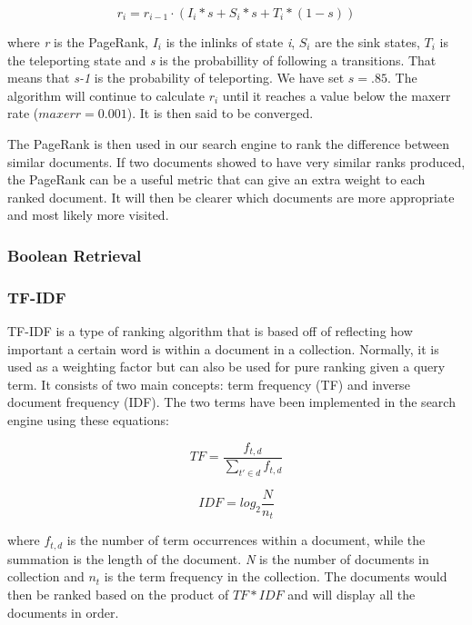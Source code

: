 $$ r_i = r_{i-1} \cdot (I_i *s + S_i * s + T_i * (1-s)) $$ 

where \emph{r} is the PageRank, \emph{$I_i$} is the inlinks of state \emph{i}, \emph{$S_i$} are the sink states, \emph{$T_i$} is the teleporting state and \emph{s} is the probabillity of following a transitions. That means that \emph{s-1} is the probability of teleporting. We have set $s=.85$. The algorithm will continue to calculate \emph{$r_i$} until it reaches a value below the maxerr rate ($maxerr = 0.001$). It is then said to be converged. 

The PageRank is then used in our search engine to rank the difference between similar documents. If two documents showed to have very similar ranks produced, the PageRank can be a useful metric that can give an extra weight to each ranked document. It will then be clearer which documents are more appropriate and most likely more visited. 



\subsubsection{Boolean Retrieval} %
\label{ssub:boolean_retrieval}


\subsubsection{TF-IDF} %
\label{sub:tf_idf}

TF-IDF is a type of ranking algorithm that is based off of reflecting how important a certain word is within a document in a collection. Normally, it is used as a weighting factor but can also be used for pure ranking given a query term. It consists of two main concepts:  term frequency (TF) and inverse document frequency (IDF). The two terms have been implemented in the search engine using these equations:

$$TF = \frac{f_{t,d}}{\sum\limits_{t' \in d} f_{t,d}}$$

$$IDF = log_2 \frac{N}{n_t}$$

where $f_{t,d}$ is the number of term occurrences within a document, while the summation is the length of the document. \emph{N} is the number of documents in collection and $n_t$ is the term frequency in the collection. The documents would then be ranked based on the product of $TF * IDF$ and will display all the documents in order. 

